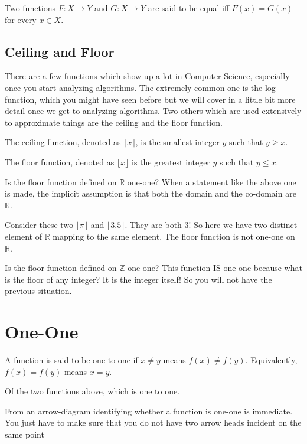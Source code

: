 \documentclass[12pt]{article}
\begin{document}
Two functions $F: X \rightarrow Y$ and $G: X \rightarrow Y$ are said to be equal iff $F(x) = G(x)$ for every $x \in X$.

\subsection*{Ceiling and Floor}
There are a few functions which show up a lot in Computer Science, especially once you start analyzing algorithms. The extremely common one is the log function, which you might have seen before but we will cover in a little bit more detail once we get to analyzing algorithms.
Two others which are used extensively to approximate things are the ceiling and the floor function.

The ceiling function, denoted as $\lceil x \rceil$, is the smallest integer $y$ such that $y \ge x$. 

The floor function, denoted as $\lfloor x \rfloor$ is the greatest integer $y$ such that $y \le x$.

\medskip

Is the floor function defined on $\mathbb{R}$ one-one? 
When a statement like the above one is made, the implicit assumption is that both the domain and the co-domain are $\mathbb{R}$. 

Consider these two $\lfloor \pi \rfloor$ and $\lfloor 3.5 \rfloor$. They are both 3! So here we have two distinct element of $\mathbb{R}$ mapping to the same element. The floor function is not one-one on $\mathbb{R}$.

\medskip

Is the floor function defined on $\mathbb{Z}$ one-one?
This function IS one-one because what is the floor of any integer? It is the integer itself!
So you will not have the previous situation. 

\section*{One-One}
A function is said to be one to one if $x \neq y$ means $f(x) \neq f(y)$. Equivalently, 
$f(x) = f(y)$ means $x = y$. 

Of the two functions above, which is one to one. 

From an arrow-diagram identifying whether a function is one-one is immediate. You just have to make sure that you do not have two arrow heads incident on the same point
\end{document}
